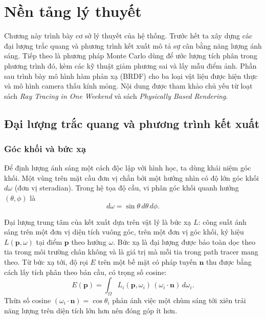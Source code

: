 \chapter{Nền tảng lý thuyết}
\label{ch:ly-thuyet}

Chương này trình bày cơ sở lý thuyết của hệ thống. Trước hết ta xây dựng các đại
lượng trắc quang và phương trình kết xuất mô tả sự cân bằng năng
lượng ánh sáng. Tiếp theo là phương pháp Monte Carlo dùng để ước lượng tích phân
trong phương trình đó, kèm các kỹ thuật giảm phương sai và lấy mẫu điểm ảnh. Phần
sau trình bày mô hình hàm phản xạ (BRDF) cho ba loại vật liệu được hiện thực và
mô hình camera thấu kính mỏng. Nội dung được tham khảo chủ yếu từ loạt sách \emph{Ray Tracing in
One Weekend} và sách
\emph{Physically Based Rendering}.

\section{Đại lượng trắc quang và phương trình kết xuất}

\subsection{Góc khối và bức xạ}
Để định lượng ánh sáng một cách độc lập với hình học, ta dùng khái niệm góc
khối. Một vùng trên mặt cầu đơn vị chắn bởi một hướng nhìn có độ
lớn góc khối $d\omega$ (đơn vị steradian). Trong hệ tọa độ cầu, vi phân góc khối
quanh hướng $(\theta,\phi)$ là
\begin{equation}
d\omega = \sin\theta\, d\theta\, d\phi .
\end{equation}

Đại lượng trung tâm của kết xuất dựa trên vật lý là bức xạ
$L$: công suất ánh sáng trên một đơn vị diện tích vuông góc, trên một đơn vị góc
khối, ký hiệu $L(\mathbf{p}, \omega)$ tại điểm $\mathbf{p}$ theo hướng $\omega$.
Bức xạ là đại lượng được bảo toàn dọc theo tia trong
môi trường chân không và là giá trị mà mỗi tia trong path tracer mang theo. Từ
bức xạ tới, độ rọi $E$ trên một bề mặt có pháp tuyến
$\mathbf{n}$ thu được bằng cách lấy tích phân theo bán cầu, có trọng số cosine:
\begin{equation}
\label{eq:irradiance}
E(\mathbf{p}) = \int_{\Omega} L_i(\mathbf{p}, \omega_i)\,
                (\omega_i \cdot \mathbf{n})\, d\omega_i .
\end{equation}
Thừa số cosine $(\omega_i\cdot\mathbf{n})=\cos\theta_i$ phản ánh việc một chùm
sáng tới xiên trải năng lượng trên diện tích lớn hơn nên đóng góp ít hơn.

